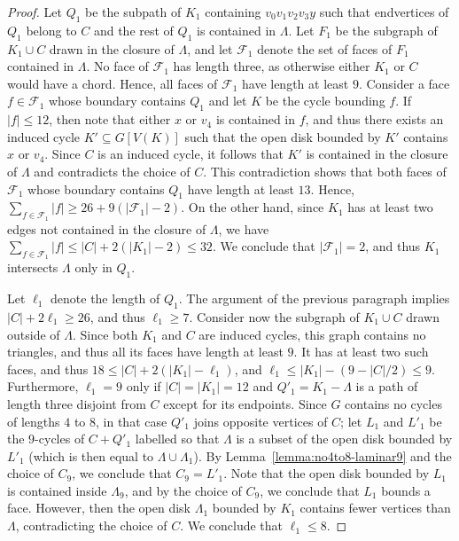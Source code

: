 \documentclass[12pt,twoside,openright,a4paper]{book}
\newcommand{\FF}{\mathcal{F}}
\begin{document}
\begin{proof}
Let $Q_1$ be the subpath of $K_1$ containing $v_0v_1v_2v_3y$ such that endvertices of $Q_1$ belong to $C$
and the rest of $Q_1$ is contained in $\Lambda$.
Let $F_1$ be the subgraph of $K_1\cup C$ drawn in the closure of $\Lambda$,
and let $\FF_1$ denote the set of faces of $F_1$ contained in $\Lambda$.  
No face of $\FF_1$ has length three, as otherwise either $K_1$ or $C$ would have a chord.
Hence, all faces of $\FF_1$ have length at least $9$. 
Consider a face $f\in \FF_1$ whose boundary contains $Q_1$ and let $K$ be the cycle bounding $f$.
If $|f|\le 12$, then note that either $x$ or $v_4$ is contained in $f$, and thus there exists
an induced cycle $K'\subseteq G[V(K)]$ such that the open disk bounded by $K'$ contains $x$ or $v_4$.
Since $C$ is an induced cycle, it follows that $K'$ is contained in the closure of $\Lambda$ and contradicts
the choice of $C$.  This contradiction shows that both faces of $\FF_1$ whose boundary contains $Q_1$
have length at least $13$.
Hence, $\sum_{f\in \FF_1} |f|\ge 26+9(|\FF_1|-2)$.
On the other hand, since $K_1$ has at least two edges not contained in the closure
of $\Lambda$, we have $\sum_{f\in \FF_1} |f|\le |C|+2(|K_1|-2)\le 32$.
We conclude that $|\FF_1|=2$, and thus $K_1$ intersects $\Lambda$ only in $Q_1$.

Let $\ell_1$ denote the length of $Q_1$.  The argument of the previous paragraph implies $|C|+2\ell_1\ge 26$,
and thus $\ell_1\ge 7$.
Consider now the subgraph of $K_1\cup C$ drawn outside of $\Lambda$.  Since both $K_1$ and $C$ are induced cycles,
this graph contains no triangles, and thus all its faces have length at least $9$.  It has at least two
such faces, and thus $18\le |C|+2(|K_1|-\ell_1)$, and $\ell_1\le |K_1|-(9-|C|/2)\le 9$.
Furthermore, $\ell_1=9$ only if $|C|=|K_1|=12$ and $Q'_1=K_1-\Lambda$ is a path of length three disjoint
from $C$ except for its endpoints.  Since $G$ contains no cycles of lengths $4$ to $8$, in that case $Q'_1$
joins opposite vertices of $C$; let $L_1$ and $L'_1$ be the $9$-cycles of $C+Q'_1$ labelled so that $\Lambda$
is a subset of the open disk bounded by $L'_1$ (which is then equal to $\Lambda\cup\Lambda_1$).
By Lemma~\ref{lemma:no4to8-laminar9} and the choice of $C_9$,
we conclude that $C_9=L'_1$.  Note that the open disk bounded by $L_1$ is contained inside $\Lambda_9$,
and by the choice of $C_9$, we conclude that $L_1$ bounds a face.  However, then the open disk $\Lambda_1$ bounded
by $K_1$ contains fewer vertices than $\Lambda$, contradicting the choice of $C$.
We conclude that $\ell_1\le 8$.


\end{proof}
\end{document}
